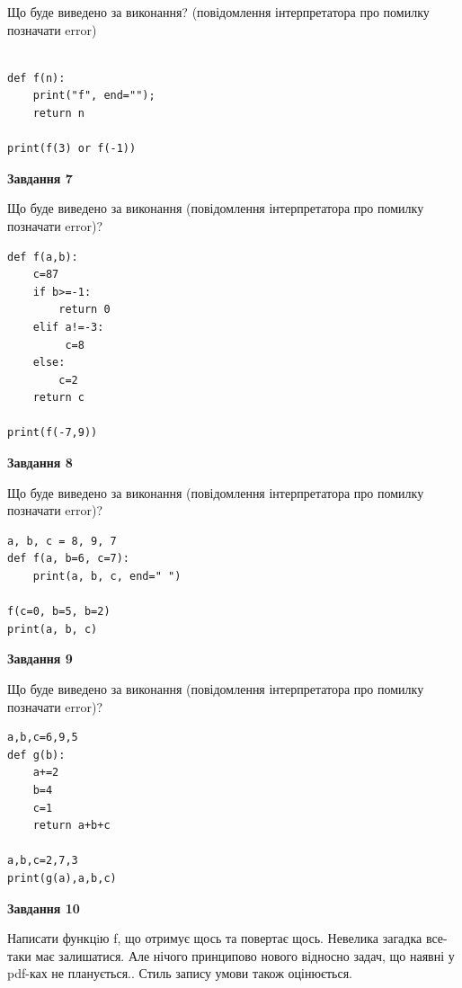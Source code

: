 \documentclass[12pt, ukrainian]{article}
\begin{document}
{\begin {large}
Що буде виведено за виконання? (повідомлення інтерпретатора про помилку позначати error)\par
\begin{verbatim}

def f(n):
    print("f", end="");
    return n

print(f(3) or f(-1))
\end{verbatim}

{\begin {center}\textbf{Завдання 7}\end {center}}

Що буде виведено за виконання (повідомлення інтерпретатора про помилку позначати error)?\par
\begin{verbatim}
def f(a,b):
    c=87
    if b>=-1:
        return 0
    elif a!=-3:
         c=8
    else: 
        c=2
    return c

print(f(-7,9))
\end{verbatim}

{\begin {center}\textbf{Завдання 8}\end {center}}

Що буде виведено за виконання (повідомлення інтерпретатора про помилку позначати error)?\par
\begin{verbatim}
a, b, c = 8, 9, 7
def f(a, b=6, c=7):
    print(a, b, c, end=" ")

f(c=0, b=5, b=2)
print(a, b, c)
\end{verbatim}

{\begin {center}\textbf{Завдання 9}\end {center}}

Що буде виведено за виконання (повідомлення інтерпретатора про помилку позначати error)?\par
\begin{verbatim}
a,b,c=6,9,5
def g(b):
    a+=2
    b=4
    c=1
    return a+b+c

a,b,c=2,7,3
print(g(a),a,b,c)
\end{verbatim}

{\begin {center}\textbf{Завдання 10}\end {center}}


Написати функцiю f, що отримує щось та повертає щось. Невелика загадка все-таки має залишатися. Але нічого принципово нового відносно задач, що наявні у pdf-ках не планується.. Стиль запису умови також оцінюється.\par
\end {large}}
\newpage
\end{document}
